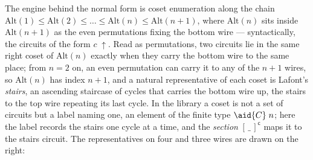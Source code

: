 The engine behind the normal form is coset enumeration along the chain $\mathrm{Alt}(1) \le \mathrm{Alt}(2) \le \dots \le \mathrm{Alt}(n) \le \mathrm{Alt}(n{+}1)$, where $\mathrm{Alt}(n)$ sits inside $\mathrm{Alt}(n{+}1)$ as the even permutations fixing the bottom wire --- syntactically, the circuits of the form $c\;{\uparrow}$. Read as permutations, two circuits lie in the same right coset of $\mathrm{Alt}(n)$ exactly when they carry the bottom wire to the same place; from $n = 2$ on, an even permutation can carry it to any of the $n{+}1$ wires, so $\mathrm{Alt}(n)$ has index $n{+}1$, and a natural representative of each coset is Lafont's \emph{stairs}, an ascending staircase of cycles that carries the bottom wire up, the stairs to the top wire repeating its last cycle. In the library a coset is not a set of circuits but a label naming one, an element of the finite type $\aid{C}\;n$; here the label records the stairs one cycle at a time, and the \emph{section} $[\,\_\,]^{\mathsf c}$ maps it to the stairs circuit. The representatives on four and three wires are drawn on the right:

